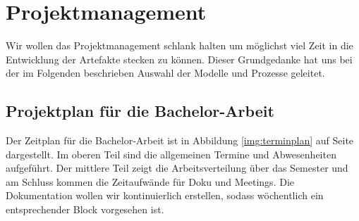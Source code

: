 \documentclass[a4paper,ngerman, 11pt, pagesize]{report}
\begin{document}
   


\chapter{Projektmanagement}
Wir wollen das Projektmanagement schlank halten um möglichst viel Zeit in die Entwicklung der Artefakte stecken zu können.
Dieser Grundgedanke hat uns bei der im Folgenden beschrieben Auswahl der Modelle und Prozesse geleitet.



\section{Projektplan für die Bachelor-Arbeit}
Der Zeitplan für die Bachelor-Arbeit ist in Abbildung \ref{img:terminplan} auf Seite \pageref{img:terminplan} dargestellt.
Im oberen Teil sind die allgemeinen Termine und Abwesenheiten aufgeführt. Der mittlere Teil zeigt die Arbeitsverteilung über das Semester und am Schluss kommen die Zeitaufwände für Doku und Meetings. Die Dokumentation wollen wir kontinuierlich erstellen, sodass wöchentlich ein entsprechender Block vorgesehen ist.
\newpage
\clearpage
\pagebreak
{}
\end{document}
